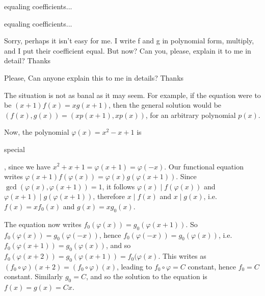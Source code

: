 \begin{solution}
	equaling coefficients...
\end{solution}



\begin{solution}
	\begin{tcolorbox}equaling coefficients...\end{tcolorbox}

Sorry, perhaps it isn't easy for me.
I write f and g in polynomial form, multiply, and I put their coefficient equal.
But now? Can you, please, explain it to me in detail?
                                                                      Thanks
\end{solution}



\begin{solution}
	Please,
Can anyone explain this to me in details?
                                                     Thanks
\end{solution}



\begin{solution}
	The situation is not as banal as it may seem. For example, if the equation were to be $(x+1)f(x)=xg(x+1)$, then the general solution would be $(f(x), g(x)) = (xp(x+1), xp(x))$, for an arbitrary polynomial $p(x)$.

Now, the polynomial $\varphi(x) = x^2 - x + 1$ is \begin{bolded}special\end{bolded}, since we have $x^2 + x + 1 = \varphi(x+1) = \varphi(-x)$. Our functional equation writes $\varphi(x+1)f(\varphi(x)) = \varphi(x)g(\varphi(x+1))$.
Since $\gcd(\varphi(x), \varphi(x+1)) = 1$, it follows $\varphi(x) \mid f(\varphi(x))$ and $\varphi(x+1) \mid g(\varphi(x+1))$, therefore $x\mid f(x)$ and $x \mid g(x)$, i.e. $f(x)=xf_0(x)$ and $g(x)=xg_0(x)$.

The equation now writes $f_0(\varphi(x)) = g_0(\varphi(x+1))$. So $f_0(\varphi(x)) = g_0(\varphi(-x))$, hence $f_0(\varphi(-x)) = g_0(\varphi(x))$, i.e. $f_0(\varphi(x+1)) = g_0(\varphi(x))$, and so $f_0(\varphi(x+2)) = g_0(\varphi(x+1)) = f_0(\varphi(x)$. This writes as $(f_0 \circ \varphi)(x+2) = (f_0 \circ \varphi)(x)$, leading to $f_0 \circ \varphi = C$ constant, hence $f_0 = C$ constant. Similarly $g_0 = C$, and so the solution to the equation is $f(x) = g(x) = Cx$.
\end{solution}



